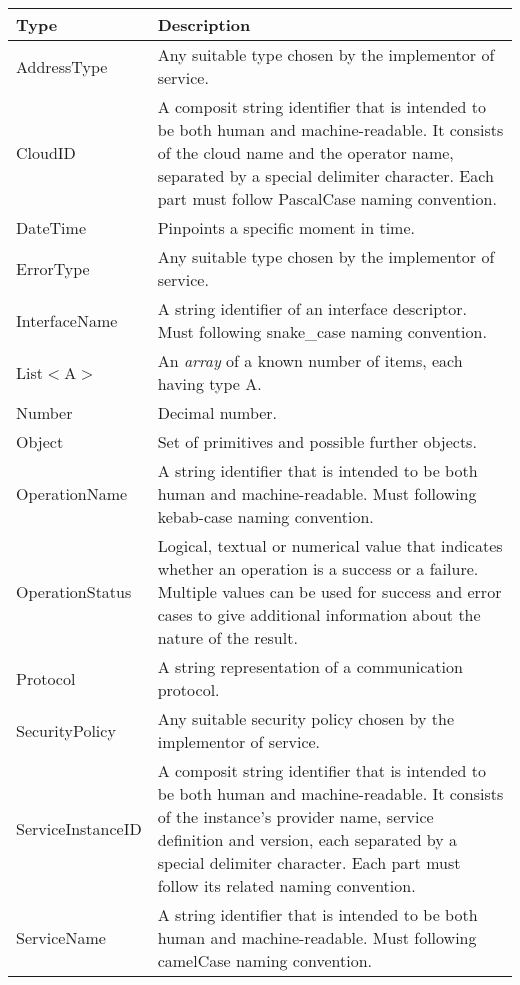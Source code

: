 \documentclass[a4paper]{arrowhead}
\newcommand{\pdef}[1]{{\textcolor{ArrowheadGrey}{#1\label{sec:model:primitives:#1}\label{sec:model:primitives:#1s}\label{sec:model:primitives:#1es}}}}
\begin{document}
\begin{table}[ht!]
\begin{tabularx}{\textwidth}{| p{3cm} | X |} \hline
\rowcolor{gray!33} Type & Description \\ \hline
\pdef{AddressType}      & Any suitable type chosen by the implementor of service. \\ \hline
\pdef{CloudID} & A composit string identifier that is intended to be both human and machine-readable. It consists of the cloud name and the operator name, separated by a special delimiter character. Each part must follow PascalCase naming convention. \\ \hline
\pdef{DateTime}         & Pinpoints a specific moment in time. \\ \hline
\pdef{ErrorType}        & Any suitable type chosen by the implementor of service. \\ \hline
\pdef{InterfaceName}& A string identifier of an interface descriptor. Must following snake_case naming convention. \\ \hline
\pdef{List}$<$A$>$      & An \textit{array} of a known number of items, each having type A. \\ \hline
\pdef{Number}           & Decimal number. \\ \hline
\pdef{Object}           & Set of primitives and possible further objects. \\ \hline
\pdef{OperationName}             & A string identifier that is intended to be both human and machine-readable. Must following kebab-case naming convention. \\ \hline
\pdef{OperationStatus}  & Logical, textual or numerical value that indicates whether an operation is a success or a failure. Multiple values can be used for success and error cases to give additional information about the nature of the result. \\ \hline
\pdef{Protocol}         & A string representation of a communication protocol. \\ \hline
\pdef{SecurityPolicy}   & Any suitable security policy chosen by the implementor of service. \\ \hline
\pdef{ServiceInstanceID} & A composit string identifier that is intended to be both human and machine-readable. It consists of the instance's provider name, service definition and version, each separated by a special delimiter character. Each part must follow its related naming convention. \\ \hline
\pdef{ServiceName}             & A string identifier that is intended to be both human and machine-readable. Must following camelCase naming convention. \\ \hline

\end{tabularx}
\end{table}
\end{document}
